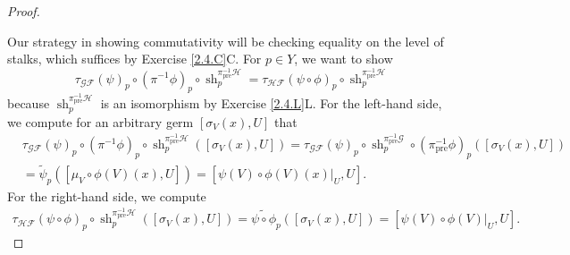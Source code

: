 \documentclass{article}
\newcommand{\fF}{\mathscr{F}}
\newcommand{\fG}{\mathscr{G}}
\newcommand{\fH}{\mathscr{H}}
\DeclareMathOperator{\pre}{pre}
\DeclareMathOperator{\sh}{sh}
\begin{document}
\begin{proof}
\begin{center}
    \end{center}
    Our strategy in showing commutativity will be checking equality on the level of stalks, which suffices by Exercise \ref{2.4.C}C. For $p\in Y$, we want to show
    \[
    \tau_{\fG \fF}(\psi)_p \circ (\pi^{-1} \phi)_p \circ \sh^{\pi^{-1}_{\pre}\fH}_p = \tau_{\fH \fF}(\psi \circ \phi)_p \circ \sh_p^{\pi^{-1}_{\pre}\fH}
    \]
    because $\sh_p^{\pi^{-1}_{\pre}\fH}$ is an isomorphism by Exercise \ref{2.4.L}L.
    For the left-hand side, we compute for an arbitrary germ $[\sigma_V(x),U]$ that
    \begin{align*}
        &\tau_{\fG \fF}(\psi)_p \circ (\pi^{-1} \phi)_p \circ \sh^{\pi^{-1}_{\pre}\fH}_p ([\sigma_V(x),U])= \tau_{\fG \fF} (\psi)_p \circ \sh_p^{\pi^{-1}_{\pre} \fG} \circ (\pi^{-1}_{\pre} \phi)_p([\sigma_V(x),U])\\
        &=\tilde \psi_p ([\mu_V \circ \phi(V)(x),U]) = [\psi(V)\circ \phi(V)(x)\vert_U,U].
    \end{align*}
    For the right-hand side, we compute
    \begin{align*}
        \tau_{\fH \fF}(\psi \circ \phi)_p \circ \sh_p^{\pi^{-1}_{\pre}\fH} ([\sigma_V(x),U])=\widetilde{\psi \circ \phi}_p([\sigma_V(x),U])=[\psi(V)\circ \phi(V)\vert_U,U].
    \end{align*}


\end{proof}
\end{document}
